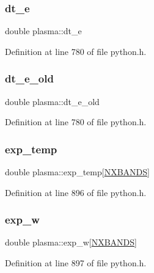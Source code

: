 \subsubsection{\texorpdfstring{dt\+\_\+e}{dt\_e}}
{\footnotesize\ttfamily double plasma\+::dt\+\_\+e}



Definition at line 780 of file python.\+h.

\mbox{\label{structplasma_a438272ea5c79f26453f113fe023e9c99}} 
\subsubsection{\texorpdfstring{dt\+\_\+e\+\_\+old}{dt\_e\_old}}
{\footnotesize\ttfamily double plasma\+::dt\+\_\+e\+\_\+old}



Definition at line 780 of file python.\+h.

\mbox{\label{structplasma_a30222105e41ccde304250f41d25b5ad7}} 
\subsubsection{\texorpdfstring{exp\+\_\+temp}{exp\_temp}}
{\footnotesize\ttfamily double plasma\+::exp\+\_\+temp\mbox{[}\hyperlink{python_8h_ac640b7fc429348ef2f6781704d3c5163}{N\+X\+B\+A\+N\+DS}\mbox{]}}



Definition at line 896 of file python.\+h.

\mbox{\label{structplasma_a9b46e8bed0dfadca5cf9966301ecec6d}} 
\subsubsection{\texorpdfstring{exp\+\_\+w}{exp\_w}}
{\footnotesize\ttfamily double plasma\+::exp\+\_\+w\mbox{[}\hyperlink{python_8h_ac640b7fc429348ef2f6781704d3c5163}{N\+X\+B\+A\+N\+DS}\mbox{]}}



Definition at line 897 of file python.\+h.

